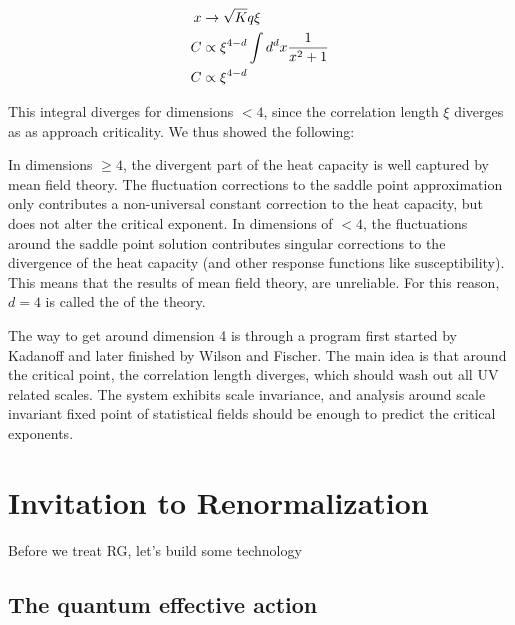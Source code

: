 \documentclass[11pt]{scrartcl}
\begin{document}
\begin{align}
x & \rightarrow \sqrt{K} q \xi \\
C &\propto \xi^{4-d} \int {d^d x} {1 \over x^2 + 1}\\
C &\propto \xi^{4-d} 
\end{align}

This integral diverges for dimensions $< 4$, since the correlation length $\xi$ diverges as as approach criticality.  We thus showed the following:
\begin{itemize}
\ii In dimensions $ \geq 4$, the divergent part of the heat capacity is well captured by mean field theory.  The fluctuation corrections to the saddle point approximation only contributes a non-universal constant correction to the heat capacity, but does not alter the critical exponent.
\ii In dimensions of $< 4$, the fluctuations around the saddle point solution contributes singular corrections to the divergence of the heat capacity (and other response functions like susceptibility).  This means that the results of mean field theory, are unreliable.  For this reason, $d=4$ is called the  of the theory.
\end{itemize}

The way to get around dimension 4 is through a program first started by Kadanoff and later finished by Wilson and Fischer.  The main idea is that around the critical point, the correlation length diverges, which should wash out all UV related scales.  The system exhibits scale invariance, and analysis around scale invariant fixed point of statistical fields should be enough to predict the critical exponents.




\section{Invitation to Renormalization}
Before we treat RG, let's build some technology
\subsection{The quantum effective action}
\end{document}
